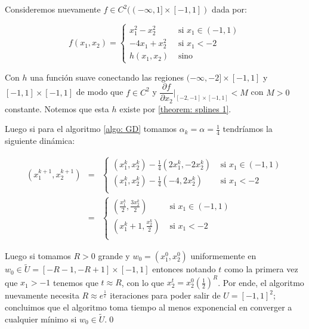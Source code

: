 \begin{example}
	Consideremos nuevamente $f \in C^2((-\infty, 1 ] \times [-1,1])$ dada por:
	
	\begin{equation*}
		f(x_1, x_2) = \left\lbrace \begin{array}{cc}
		x_1^2 - x_2^2 & \text{ si } x_1 \in (-1,1) \\
		-4x_1 + x_2^2 & \text{ si } x_1 < -2 \\
		h(x_1,x_2) & \text{ sino }
		\end{array}\right.
	\end{equation*}
	
	Con $h$ una funci\'on suave conectando las regiones $(-\infty, -2] \times [-1,1]$ y $[-1,1] \times [-1,1]$ de modo que $f \in C^2$ y $\dfrac{\partial f}{\partial x_2} \vert_{[-2,-1] \times [-1,1]} < M$ con $M>0$ constante. Notemos que esta $h$ existe por \ref{theorem: splines 1}.
	
	Luego si para el algoritmo \ref{algo: GD} tomamos $\alpha_k = \alpha = \frac{1}{4}$ tendr\'iamos la siguiente din\'amica:
	
	\begin{equation*}
	\begin{array}{rcl}
	\left(x_1^{k+1}, x^{k+1}_2\right) & = & \left\lbrace\begin{array}{cc}
	\left(x^k_1, x^k_2\right)- \frac{1}{4} \left(2x^k_1, -2x^k_2\right) & \text{ si } x_1 \in (-1,1) \\
	\left(x^k_1, x^k_2\right)- \frac{1}{4} \left(-4, 2x^k_2\right) & \text{ si } x_1 < -2 \\
	\end{array}\right. \\
	& = & \left\lbrace\begin{array}{cc}
	\left(\frac{x^k_1}{2}, \frac{3 x^k_2}{2}\right) & \text{ si } x_1 \in (-1,1) \\
	\left(x^k_1 + 1, \frac{x^k_2}{2}\right) & \text{ si } x_1 < -2 \\
	\end{array}\right.
	\end{array}
	\end{equation*}
	
	Luego si tomamos $R >0$ grande y $w_0 = (x_1^0, x_2^0)$ uniformemente en $w_0\in \widetilde{U} = \left[ -R-1, -R+1 \right]\times [-1,1]$ entonces notando $t$ como la primera vez que $x_1 > -1$ tenemos que $t \approx R$, con lo que $x_2^t = x_2^0 \left(\frac{1}{2}\right)^R$. Por ende, el algoritmo nuevamente  necesita $R \approx e^{\frac{1}{\epsilon}}$ iteraciones para poder salir de $U = [-1,1]^2$; concluimos que el algoritmo toma tiempo al menos exponencial en converger a cualquier m\'inimo si $w_0 \in \widetilde{U}$.\qed 
	
\end{example}

